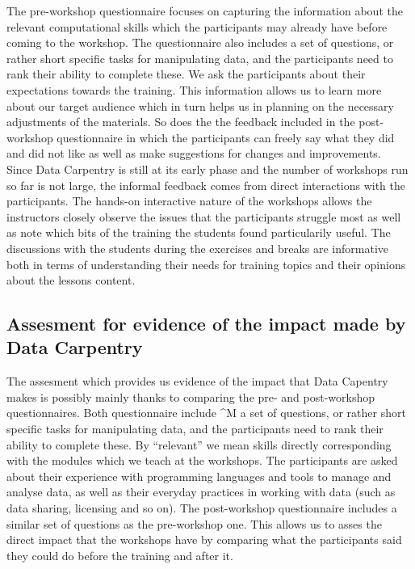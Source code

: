 \documentclass[15]{idcc}
\begin{document}
\begin{itemize}
The pre-workshop questionnaire focuses on capturing the information about the relevant computational skills which the participants may already
have before coming to the workshop. The questionnaire also includes 
a set of questions, or rather short specific tasks for manipulating data, and the participants need to rank their ability to complete these. 
We ask the participants about their expectations towards the training. This information allows us to learn more about our target audience which
in turn helps us in planning on the necessary adjustments of the materials. So does the the feedback included in the post-workshop questionnaire in which the 
participants can freely say what they did and did not like as well as  make suggestions for changes and improvements.\\ 

Since Data Carpentry is still at its early phase and the number of workshops run so far is not large, the informal feedback comes from direct interactions with the participants. 
The hands-on interactive nature of the workshops allows the instructors closely observe the issues that the participants struggle most as well as note which bits of the training the students
found particularily useful. The discussions with the students during the exercises and breaks are informative both in terms of understanding
their needs for training topics and their opinions about the lessons content. 


\subsection{Assesment for evidence of the impact made by Data Carpentry}
The assesment which provides us evidence of the impact that Data Capentry makes is possibly mainly thanks to comparing the pre- and post-workshop questionnaires. 
 Both questionnaire include ^M a set of questions, or rather short specific tasks for manipulating data, and the participants need to rank their ability to complete these.
By ``relevant'' we mean skills directly corresponding with the modules which we teach at the workshops. The 
participants are asked about their experience with programming languages and tools to manage and analyse data, as well as their everyday practices
in working with data (such as data sharing, licensing and so on). The post-workshop questionnaire includes a similar set of questions as the 
pre-workshop one. This allows us to asses the direct impact that the workshops 
have by comparing what the participants said they could do before the training and after it. 






\end{itemize}
\end{document}
